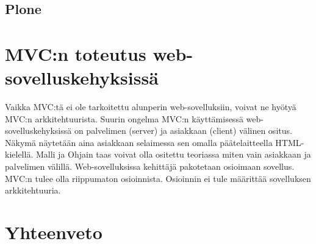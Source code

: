 \documentclass[utf8]{gradu3}
\begin{document}
\section{Plone}

\chapter{MVC:n toteutus web-sovelluskehyksissä}
Vaikka MVC:tä ei ole tarkoitettu alunperin web-sovelluksiin, voivat ne hyötyä MVC:n arkkitehtuurista. Suurin ongelma MVC:n käyttämisessä web-sovelluskehyksissä on palvelimen (server) ja asiakkaan (client) välinen ositus. Näkymä näytetään aina asiakkaan selaimessa sen omalla päätelaitteella HTML-kielellä. Malli ja Ohjain taas voivat olla ositettu teoriassa miten vain asiakkaan ja palvelimen välillä. Web-sovelluksissa kehittäjä pakotetaan osioimaan sovellus. MVC:n tulee olla riippumaton osioinnista. Osioinnin ei tule määrittää sovelluksen arkkitehtuuria.

\parencite{ibm_watson}

\chapter{Yhteenveto}
\printbibliography
\appendix
\end{document}
